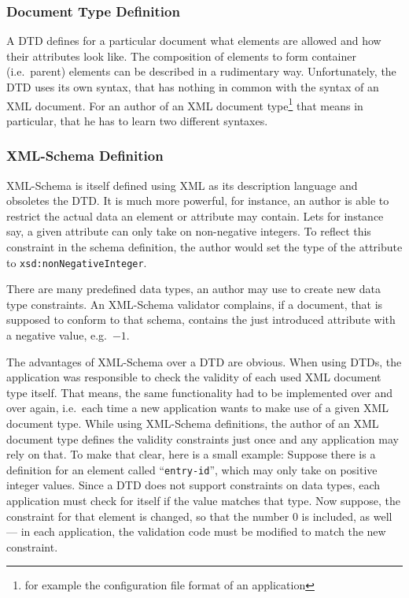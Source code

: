\subsubsection{Document Type Definition}

A DTD defines for a particular  document what elements are allowed and how
their attributes look like. The  composition of elements to form container
(i.e.~parent)   elements  can   be   described  in   a  rudimentary   way.
Unfortunately, the  DTD uses  its own syntax,  that has nothing  in common
with  the syntax of  an XML  document. For  an author  of an  XML document
type\footnote{for example the configuration file format of an application}
that means in particular, that he has to learn two different syntaxes.

\subsubsection{XML-Schema Definition}

XML-Schema is  itself defined  using XML as  its description  language and
obsoletes the  DTD. It is much  more powerful, for instance,  an author is
able to restrict the actual data an element or attribute may contain. Lets
for  instance  say,  a  given  attribute can  only  take  on  non-negative
integers.  To reflect this constraint in the schema definition, the author
would      set      the       type      of      the      attribute      to
\texttt{xsd:nonNegativeInteger}.

There are many predefined data types, an author may use to create new data
type constraints.  An XML-Schema validator complains, if  a document, that
is  supposed to  conform  to  that schema,  contains  the just  introduced
attribute with a negative value, e.g.~$-1$.

\bigskip

The advantages of XML-Schema over a DTD are obvious.  When using DTDs, the
application  was  responsible to  check  the  validity  of each  used  XML
document  type  itself. That  means,  the  same  functionality had  to  be
implemented over and over again, i.e.~each time a new application wants to
make use of a given XML document type. While using XML-Schema definitions,
the author of  an XML document type defines  the validity constraints just
once and any application  may rely on that. To make that  clear, here is a
small  example:  Suppose there  is  a  definition  for an  element  called
``\texttt{entry-id}'',  which may  only take  on positive  integer values.
Since a DTD  does not support constraints on  data types, each application
must check  for itself if  the value matches  that type. Now  suppose, the
constraint  for  that  element is  changed,  so  that  the number  $0$  is
included, as  well ---  in each application,  the validation code  must be
modified to match the new constraint.

